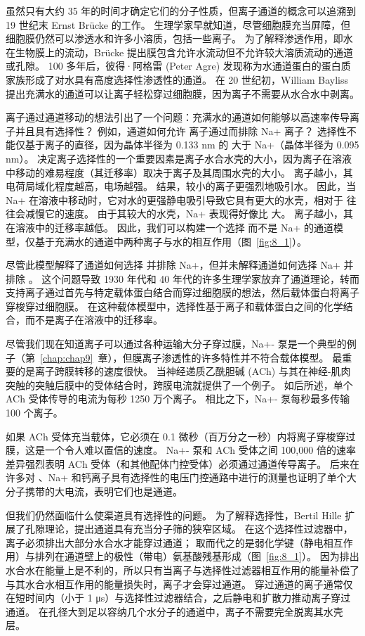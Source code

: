 虽然只有大约 35 年的时间才确定它们的分子性质，但离子通道的概念可以追溯到 19 世纪末 Ernst Brücke 的工作。
生理学家早就知道，尽管细胞膜充当屏障，但细胞膜仍然可以渗透水和许多小溶质，包括一些离子。
为了解释渗透作用，即水在生物膜上的流动，Brücke 提出膜包含允许水流动但不允许较大溶质流动的通道或孔隙。
100 多年后，彼得·阿格雷 (Peter Agre) 发现称为水通道蛋白的蛋白质家族形成了对水具有高度选择性渗透性的通道。
在 20 世纪初，William Bayliss 提出充满水的通道可以让离子轻松穿过细胞膜，因为离子不需要从水合水中剥离。


离子通过通道移动的想法引出了一个问题：充满水的通道如何能够以高速率传导离子并且具有选择性？
例如，通道如何允许  离子通过而排除 Na+ 离子？
选择性不能仅基于离子的直径，因为晶体半径为 0.133 nm 的  大于 Na+（晶体半径为 0.095 nm）。
决定离子选择性的一个重要因素是离子水合水壳的大小，因为离子在溶液中移动的难易程度（其迁移率）取决于离子及其周围水壳的大小。
离子越小，其电荷局域化程度越高，电场越强。
结果，较小的离子更强烈地吸引水。
因此，当 Na+ 在溶液中移动时，它对水的更强静电吸引导致它具有更大的水壳，相对于  往往会减慢它的速度。
由于其较大的水壳，Na+ 表现得好像比  大。
离子越小，其在溶液中的迁移率越低。
因此，我们可以构建一个选择  而不是 Na+ 的通道模型，仅基于充满水的通道中两种离子与水的相互作用（图~\ref{fig:8_1}）。


尽管此模型解释了通道如何选择  并排除 Na+，但并未解释通道如何选择 Na+ 并排除 。
这个问题导致 1930 年代和 40 年代的许多生理学家放弃了通道理论，转而支持离子通过首先与特定载体蛋白结合而穿过细胞膜的想法，然后载体蛋白将离子穿梭穿过细胞膜。
在这种载体模型中，选择性基于离子和载体蛋白之间的化学结合，而不是离子在溶液中的迁移率。


尽管我们现在知道离子可以通过各种运输大分子穿过膜，Na+- 泵是一个典型的例子（第~\ref{chap:chap9}~章），但膜离子渗透性的许多特性并不符合载体模型。
最重要的是离子跨膜转移的速度很快。 
当神经递质乙酰胆碱 (ACh) 与其在神经-肌肉突触的突触后膜中的受体结合时，跨膜电流就提供了一个例子。
如后所述，单个 ACh 受体传导的电流为每秒 1250 万个离子。
相比之下，Na+- 泵每秒最多传输 100 个离子。


如果 ACh 受体充当载体，它必须在 0.1 微秒（百万分之一秒）内将离子穿梭穿过膜，这是一个令人难以置信的速度。
Na+- 泵和 ACh 受体之间 100,000 倍的速率差异强烈表明 ACh 受体（和其他配体门控受体）必须通过通道传导离子。
后来在许多对 、Na+ 和钙离子具有选择性的电压门控通路中进行的测量也证明了单个大分子携带的大电流，表明它们也是通道。

但我们仍然面临什么使渠道具有选择性的问题。
为了解释选择性，Bertil Hille 扩展了孔隙理论，提出通道具有充当分子筛的狭窄区域。
在这个选择性过滤器中，离子必须排出大部分水合水才能穿过通道；
取而代之的是弱化学键（静电相互作用）与排列在通道壁上的极性（带电）氨基酸残基形成（图~\ref{fig:8_1}）。
因为排出水合水在能量上是不利的，所以只有当离子与选择性过滤器相互作用的能量补偿了与其水合水相互作用的能量损失时，离子才会穿过通道。
穿过通道的离子通常仅在短时间内（小于 1 μs）与选择性过滤器结合，之后静电和扩散力推动离子穿过通道。
在孔径大到足以容纳几个水分子的通道中，离子不需要完全脱离其水壳层。


